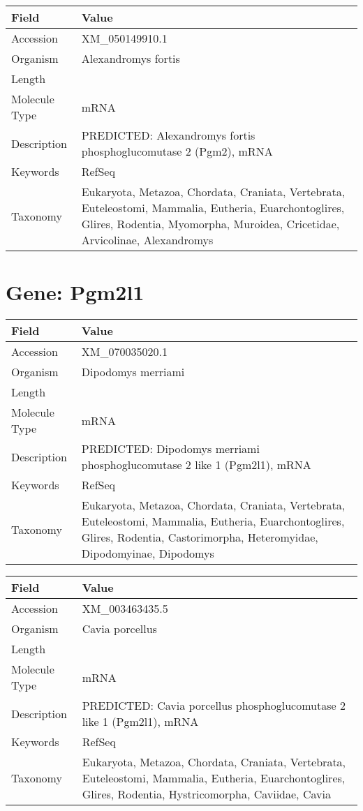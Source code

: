 \documentclass[10pt]{article}
\begin{document}
\vspace{1em}
{\footnotesize
\begin{longtable}{>{\raggedright\arraybackslash}p{4.5cm} >{\raggedright\arraybackslash}p{11.5cm}}
\textbf{Field} & \textbf{Value} \\
\hline
Accession & XM\_050149910.1 \\
Organism & Alexandromys fortis \\
Length & 2374 \\
Molecule Type & mRNA \\
Description & PREDICTED: Alexandromys fortis phosphoglucomutase 2 (Pgm2), mRNA \\
Keywords & RefSeq \\
Taxonomy & Eukaryota, Metazoa, Chordata, Craniata, Vertebrata, Euteleostomi, Mammalia, Eutheria, Euarchontoglires, Glires, Rodentia, Myomorpha, Muroidea, Cricetidae, Arvicolinae, Alexandromys \\
\end{longtable}
}

\vspace{1em}
\section{Gene: Pgm2l1}
{\footnotesize
\begin{longtable}{>{\raggedright\arraybackslash}p{4.5cm} >{\raggedright\arraybackslash}p{11.5cm}}
\textbf{Field} & \textbf{Value} \\
\hline
Accession & XM\_070035020.1 \\
Organism & Dipodomys merriami \\
Length & 8788 \\
Molecule Type & mRNA \\
Description & PREDICTED: Dipodomys merriami phosphoglucomutase 2 like 1 (Pgm2l1), mRNA \\
Keywords & RefSeq \\
Taxonomy & Eukaryota, Metazoa, Chordata, Craniata, Vertebrata, Euteleostomi, Mammalia, Eutheria, Euarchontoglires, Glires, Rodentia, Castorimorpha, Heteromyidae, Dipodomyinae, Dipodomys \\
\end{longtable}
}

\vspace{1em}
{\footnotesize
\begin{longtable}{>{\raggedright\arraybackslash}p{4.5cm} >{\raggedright\arraybackslash}p{11.5cm}}
\textbf{Field} & \textbf{Value} \\
\hline
Accession & XM\_003463435.5 \\
Organism & Cavia porcellus \\
Length & 8261 \\
Molecule Type & mRNA \\
Description & PREDICTED: Cavia porcellus phosphoglucomutase 2 like 1 (Pgm2l1), mRNA \\
Keywords & RefSeq \\
Taxonomy & Eukaryota, Metazoa, Chordata, Craniata, Vertebrata, Euteleostomi, Mammalia, Eutheria, Euarchontoglires, Glires, Rodentia, Hystricomorpha, Caviidae, Cavia \\
\end{longtable}
}
\end{document}
